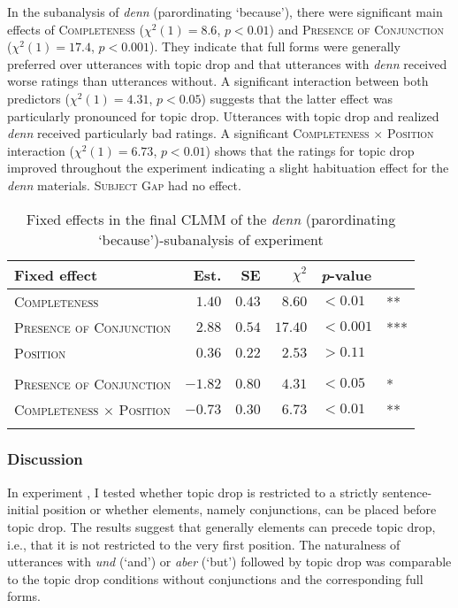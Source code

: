 In the subanalysis of \textit{denn} (parordinating `because'), there were significant main effects of \textsc{Completeness} ($\chi^2(1) = 8.6$, $p < 0.01$) and \textsc{Presence of Conjunction} ($\chi^2(1) = 17.4$, $p < 0.001$).
They indicate that full forms were generally preferred over utterances with topic drop and that utterances with \textit{denn} received worse ratings than utterances without.
A significant interaction between both predictors ($\chi^2(1) = 4.31$, $p < 0.05$) suggests that the latter effect was particularly pronounced for topic drop.
Utterances with topic drop and realized \textit{denn} received particularly bad ratings.
A significant \textsc{Completeness} $\times$ \textsc{Position}  interaction ($\chi^2(1) = 6.73$, $p < 0.01$) shows that the ratings for topic drop improved throughout the experiment indicating a slight habituation effect for the \textit{denn} materials.
\textsc{Subject Gap} had no effect.

\begin{table}
\caption{Fixed effects in the final CLMM of the \textit{denn} (parordinating `because')-subanalysis of experiment }
\centering
\begin{tabular}{lrrrll}
\lsptoprule
Fixed effect & Est. & SE & $\chi^2$ & \textit{p}-value &   \\
\midrule
\textsc{Completeness} & $1.40$ & $0.43$ & $8.60$ & $< 0.01$ & **\\
\textsc{Presence of Conjunction} & $2.88$  & $0.54$ & $17.40$ & $< 0.001$ & ***\\
\textsc{Position} & $0.36$ & $0.22$ & $2.53$ & $> 0.11$ & \\
\Centerstack[l]{\textsc{Completeness} $\times$ \\\textsc{Presence of Conjunction}} & $-1.82$  & $0.80$ & $4.31$ & $< 0.05$ & *\\
\textsc{Completeness} $\times$ \textsc{Position} & $-0.73$ & $0.30$ & $6.73$ & $< 0.01$ & **\\
\lspbottomrule
\end{tabular}
\label{tab:conjunction.denn.model}
\end{table}

\subsubsection{Discussion}
In experiment , I tested whether topic drop is restricted to a strictly sentence-initial position or whether elements, namely conjunctions, can be placed before topic drop.
The results suggest that generally elements can precede topic drop, i.e., that it is not restricted to the very first position.
The naturalness of utterances with \textit{und} (`and') or \textit{aber} (`but') followed by topic drop was comparable to the topic drop conditions without conjunctions and the corresponding full forms.

